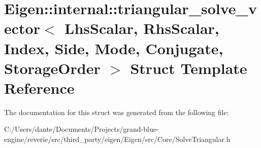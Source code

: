 \hypertarget{struct_eigen_1_1internal_1_1triangular__solve__vector}{}\section{Eigen\+::internal\+::triangular\+\_\+solve\+\_\+vector$<$ Lhs\+Scalar, Rhs\+Scalar, Index, Side, Mode, Conjugate, Storage\+Order $>$ Struct Template Reference}
\label{struct_eigen_1_1internal_1_1triangular__solve__vector}


The documentation for this struct was generated from the following file\+:\begin{DoxyCompactItemize}
\item 
C\+:/\+Users/dante/\+Documents/\+Projects/grand-\/blue-\/engine/reverie/src/third\+\_\+party/eigen/\+Eigen/src/\+Core/Solve\+Triangular.\+h\end{DoxyCompactItemize}
